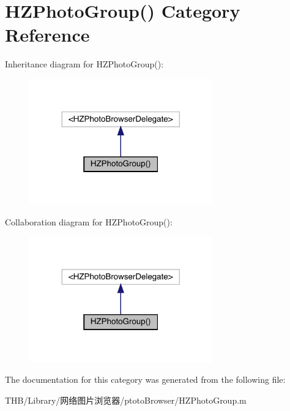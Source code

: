 \hypertarget{category_h_z_photo_group_07_08}{}\section{H\+Z\+Photo\+Group() Category Reference}
\label{category_h_z_photo_group_07_08}


Inheritance diagram for H\+Z\+Photo\+Group()\+:\nopagebreak
\begin{figure}[H]
\begin{center}
\leavevmode
\includegraphics[width=224pt]{category_h_z_photo_group_07_08__inherit__graph}
\end{center}
\end{figure}


Collaboration diagram for H\+Z\+Photo\+Group()\+:\nopagebreak
\begin{figure}[H]
\begin{center}
\leavevmode
\includegraphics[width=224pt]{category_h_z_photo_group_07_08__coll__graph}
\end{center}
\end{figure}


The documentation for this category was generated from the following file\+:\begin{DoxyCompactItemize}
\item 
T\+H\+B/\+Library/网络图片浏览器/ptoto\+Browser/H\+Z\+Photo\+Group.\+m\end{DoxyCompactItemize}
